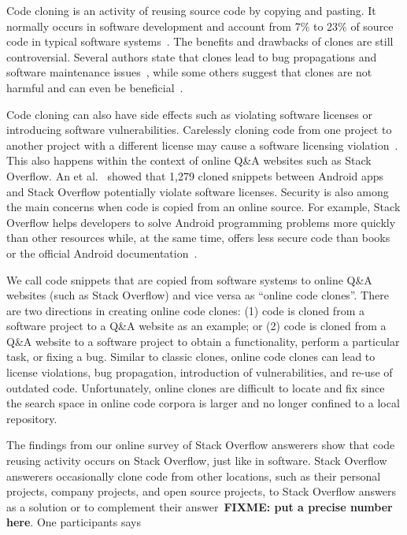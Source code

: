 \documentclass[10pt,journal,compsoc]{IEEEtran}
\newcommand\FIXME[1]{{\color{red}\textbf{FIXME: #1}}}
\begin{document}
Code cloning is an activity of reusing source code by copying and
pasting. It normally occurs in software development and account from
7\% to 23\% of source code in typical software
systems~\cite{Bellon2007}. The benefits and drawbacks of clones are
still controversial. Several authors state that clones lead to bug
propagations and software maintenance issues~\cite{Kamiya2002}, while
some others suggest that clones are not harmful and can even be
beneficial~\cite{Saini2016,Kapser2006}.

Code cloning can also have side effects such as violating software
licenses or introducing software vulnerabilities. Carelessly cloning
code from one project to another project with a different license may
cause a software licensing violation~\cite{German2009}. This also
happens within the context of online Q\&A websites such as Stack
Overflow. An et al.~\cite{An2017} showed that 1,279 cloned snippets
between Android apps and Stack Overflow potentially violate software
licenses. Security is also among the main concerns when code is copied
from an online source. For example, Stack Overflow helps developers to solve
Android programming problems more quickly than other resources while,
at the same time, offers less secure code than books or the official
Android documentation~\cite{Acar2016}.

We call code snippets that are copied from software systems to online
Q\&A websites (such as Stack Overflow) and vice versa as ``online
code clones''. There are two
directions in creating online code clones: (1) code is cloned from a software
project to a Q\&A website as an example; or (2) code is cloned from a
Q\&A website to a software project to obtain a functionality, perform
a particular task, or fixing a bug.
Similar to classic clones, online code clones can lead to license
violations, bug propagation, introduction of vulnerabilities, and
re-use of outdated code. Unfortunately, online clones are 
difficult to locate and fix since the search space in online code
corpora is larger and no longer confined to a local repository.

The findings from our online survey of Stack Overflow answerers show that code
reusing activity occurs on Stack Overflow, just like in software. Stack Overflow
answerers occasionally clone code from other locations, such as their personal
projects, company projects, and open source projects, to Stack Overflow answers
as a solution or to complement their answer~\FIXME{put a precise number here}.
One participants says
\end{document}
